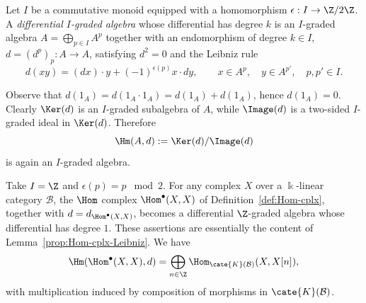 \begin{definition}\label{def:dg-algebra-preview}
	Let $I$ be a commutative monoid equipped with a homomorphism
	$\epsilon:I\to\Z/2\Z$. A \emph{differential $I$-graded algebra} whose
	differential has degree $k$ is an $I$-graded algebra
	$A=\bigoplus_{p\in I}A^p$ together with an endomorphism of degree $k\in I$,
	$d=(d^p)_p:A\to A$, satisfying $d^2=0$ and the Leibniz rule
	\[ d(xy)=(dx)\cdot y+(-1)^{\epsilon(p)}x\cdot dy,
	\qquad x\in A^p,\quad y\in A^{p'},\quad p,p'\in I. \]
\end{definition}

Observe that $d(1_A)=d(1_A\cdot1_A)=d(1_A)+d(1_A)$, hence $d(1_A)=0$.
Clearly $\Ker(d)$ is an $I$-graded subalgebra of $A$, while $\Image(d)$ is a
two-sided $I$-graded ideal in $\Ker(d)$. Therefore
\[ \Hm(A,d):=\Ker(d)/\Image(d) \]
is again an $I$-graded algebra.

\begin{example}
	Take $I=\Z$ and $\epsilon(p)=p\;\bmod 2$. For any complex $X$ over a
	$\Bbbk$-linear category $\mathcal{B}$, the $\Hom$ complex
	$\Hom^\bullet(X,X)$ of Definition~\ref{def:Hom-cplx}, together with
	$d=d_{\Hom^\bullet(X,X)}$, becomes a differential $\Z$-graded algebra
	whose differential has degree $1$. These assertions are essentially the
	content of Lemma~\ref{prop:Hom-cplx-Leibniz}. We have
	\[ \Hm(\Hom^\bullet(X,X),d)=
	\bigoplus_{n\in\Z}\Hom_{\cate{K}(\mathcal{B})}(X,X[n]), \]
	with multiplication induced by composition of morphisms in
	$\cate{K}(\mathcal{B})$.
\end{example}

